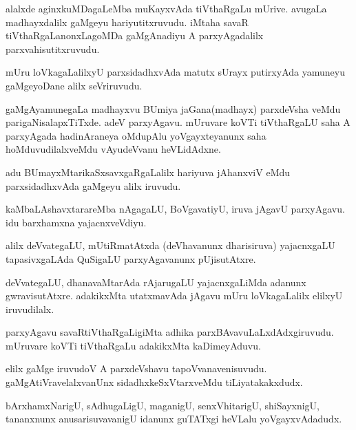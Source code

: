 \documentclass{article}
\begin{document}
\begin{mn}
alalxde aginxkuMDagaLeMba muKayxvAda tiVthaRgaLu mUrive. avugaLa madhayxdalilx gaMgeyu 
hariyutitxruvudu. iMtaha savaR tiVthaRgaLanonxLagoMDa gaMgAnadiyu A parxyAgadalilx 
parxvahisutitxruvudu.
\end{mn}

\begin{mn}
mUru loVkagaLalilxyU parxsidadhxvAda matutx sUrayx putirxyAda yamuneyu gaMgeyoDane alilx 
seVriruvudu.
\end{mn}

\begin{mn}
gaMgAyamunegaLa madhayxvu BUmiya jaGana(madhayx) parxdeVsha veMdu parigaNisalapxTiTxde. adeV 
parxyAgavu. mUruvare koVTi tiVthaRgaLU saha A parxyAgada hadinAraneya oMdupAlu yoVgayxteyanunx 
saha hoMduvudilalxveMdu vAyudeVvanu heVLidAdxne.
\end{mn}

\begin{mn}
adu BUmayxMtarikaSxsavxgaRgaLalilx hariyuva jAhanxviV eMdu parxsidadhxvAda gaMgeyu alilx  iruvudu.
\end{mn}


\begin{mn}
kaMbaLAshavxtarareMba nAgagaLU, BoVgavatiyU, iruva jAgavU parxyAgavu. idu barxhamxna yajacnxveVdiyu.
\end{mn}

\begin{mn}
alilx deVvategaLU, mUtiRmatAtxda (deVhavanunx dharisiruva) yajacnxgaLU tapasivxgaLAda QuSigaLU 
parxyAgavanunx pUjisutAtxre.
\end{mn}

\begin{mn}
deVvategaLU, dhanavaMtarAda rAjarugaLU yajacnxgaLiMda adanunx gwravisutAtxre. adakikxMta 
utatxmavAda jAgavu mUru loVkagaLalilx elilxyU iruvudilalx.
\end{mn}

\begin{mn}
parxyAgavu savaRtiVthaRgaLigiMta adhika parxBAvavuLaLxdAdxgiruvudu. mUruvare koVTi tiVthaRgaLu 
adakikxMta kaDimeyAduvu.
\end{mn}

\begin{mn}
elilx gaMge iruvudoV A parxdeVshavu tapoVvanavenisuvudu. gaMgAtiVravelalxvanUnx 
sidadhxkeSxVtarxveMdu tiLiyatakakxdudx.
\end{mn}

\begin{mn}
bArxhamxNarigU, sAdhugaLigU, maganigU, senxVhitarigU, shiSayxnigU, tananxnunx anusarisuvavanigU 
idanunx guTATxgi heVLalu yoVgayxvAdadudx.
\end{mn}
\end{document}
